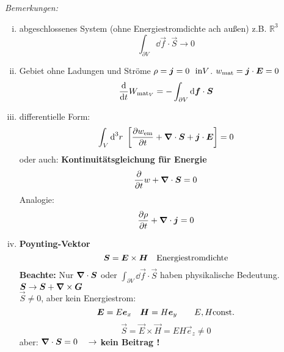 %
%
%
\noindent
\emph{Bemerkungen:}
\begin{enumerate}[i)]
	\item abgeschlossenes System (ohne Energiestromdichte ach außen) z.B. $ \mathbb{R}^3 $
	\begin{equation*}
	\int_{\partial V} \dd \vec{f} \cdot \vec{S} \rightarrow 0
	\end{equation*}
	\item Gebiet ohne Ladungen und Ströme $ \rho = \bm{j} = 0 \ \ \textrm{in} V $. $ w_{\textrm{mat}} = \bm{j} \cdot \bm{E} = 0 $
	\begin{equation*}
	\frac{\textrm{d} }{\textrm{d} t} W_{\textrm{mat}_V} = - \int_{\partial V} \textrm{d} \bm{f} \cdot \bm{S}
	\end{equation*}
	\item differentielle Form:
	\begin{equation*}
	\int_V \textrm{d}^3 r \ \left[\frac{\partial w_{\textrm{em}}}{\partial t} + \bm{\nabla} \cdot \bm{S} + \bm{j} \cdot \bm{E}\right] = 0
	\end{equation*}
	oder auch: \textbf{Kontinuitätsgleichung für Energie}
	\begin{equation*}
	\frac{\partial }{\partial t} w + \bm{\nabla} \cdot \bm{S} = 0
	\end{equation*}
	Analogie:
	\begin{equation*}
	\frac{\partial \rho}{\partial t} + \bm{\nabla} \cdot \bm{j} = 0
	\end{equation*}
	\item \textbf{Poynting-Vektor}
	\begin{equation*}
	\bm{S} = \bm{E} \times \bm{H} \quad \textrm{Energiestromdichte}
	\end{equation*}
	\textbf{Beachte:} Nur $ \bm{\nabla} \cdot \bm{S} $ oder $ \int_{\partial V} \dd \vec{f} \cdot \vec{S} $ haben physikalische Bedeutung.\\[5pt]
	$ \bm{S} \to \bm{S} + \bm{\nabla} \times \bm{G} $\\
	$ \vec{S} \neq 0 $, aber kein Energiestrom:
	\begin{equation*}
	\bm{E} = E \bm{e}_x \quad \bm{H} = H \bm{e}_y \qquad E,H \textrm{const.}
	\end{equation*}
	\begin{equation*}
	\vec{S} = \vec{E} \times \vec{H} = E H \vec{e}_z \neq 0
	\end{equation*}
	aber: $ \bm{\nabla} \cdot \bm{S} = 0  \quad \rightarrow $ \textbf{kein Beitrag !}
\end{enumerate}
